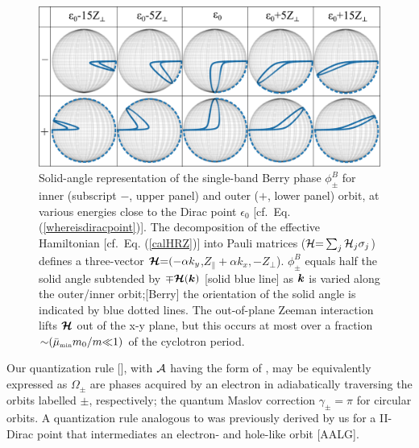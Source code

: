\documentclass[aps, prb, showpacs, twocolumn, notitlepage, superscriptaddress]{revtex4-1}
\begin{document}
\begin{figure}
\includegraphics[width=1.0\columnwidth]{blochsphere.png}
\caption{Solid-angle representation of  the single-band Berry phase $\phi_{\pm}^B$ for inner (subscript $-$, upper panel) and outer ($+$, lower panel) orbit, at various energies close to the Dirac point $\epsilon_0$ [cf.\ Eq. (\ref{whereisdiracpoint})]. The decomposition of the effective Hamiltonian [cf.\ Eq. (\ref{calHRZ})] into  Pauli matrices (${\cal H}{=}\sum_j{\cal H}_j\sigma_j$) defines a three-vector $\boldsymbol{{\cal H}}{=}({-}\alpha k_y$,$Z_\parallel{+}\alpha k_x,{-}Z_\perp$). $\phi_{\pm}^B$ equals half the solid angle subtended by   ${\mp} \boldsymbol{{\cal H}}(\boldsymbol{k})$ [solid blue line] as $\boldsymbol{k}$ is varied along the outer/inner orbit;[Berry] the orientation of the solid angle is indicated by blue dotted lines. The out-of-plane Zeeman interaction lifts $\boldsymbol{{\cal H}}$ out of the x-y plane, but this occurs at most over a fraction ${\sim}(\bar{\mu}_{\scriptscriptstyle{\text{min}}}m_0/m{\ll}1)$ of the cyclotron period. \label{fig:blochsphere}}
\end{figure}

Our quantization rule [], with ${\cal A}$ having the form of , may be equivalently expressed as
$\Omega_{\pm}$ are phases acquired by an electron in adiabatically traversing the orbits labelled $\pm$, respectively; the quantum Maslov correction $\gamma_{\pm}{=}\pi$ for circular orbits.  A quantization rule analogous to  was previously derived by us for a II-Dirac point that intermediates an electron- and hole-like orbit [AALG]. 

\end{document}
